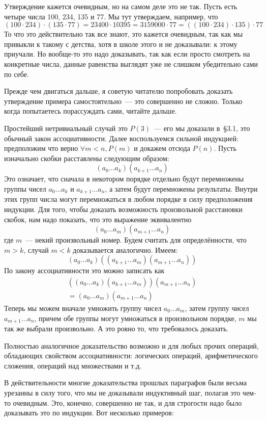 Утверждение кажется очевидным, но на самом деле это не так. Пусть есть четыре числа 100, 234, 135 и 77. Мы тут утверждаем, например, что
$$(100\cdot 234)\cdot (135 \cdot77) = 23400 \cdot 10395 = 3159000 \cdot 77 = ((100\cdot 234)\cdot 135) \cdot77$$
То что это действительно так все знают, это кажется очевидным, так как мы привыкли к такому с детства, хотя в школе этого и не доказывали: к этому приучали. Но вообще-то это надо доказывать, так как если просто смотреть на конкретные числа, данные равенства выглядят уже не слишком убедительно сами по себе.

Прежде чем двигаться дальше, я советую читателю попробовать доказать утверждение примера самостоятельно~--- это совершенно не сложно. Только когда попытаетесь порассуждать сами, читайте дальше.

Простейший нетривиальный случай это $P(3)$~--- его мы доказали в~\S3.1, это обычный закон ассоциативности. Далее воспользуемся сильной индукцией: предположим что верно $\forall m<n, P(m)$ и докажем отсюда $P(n)$. Пусть изначально скобки расставлены следующим образом:
$$(a_0\ldots a_k)(a_{k+1}\ldots a_n)$$
Это означает, что сначала в некотором порядке отдельно будут перемножены группы чисел $a_0\ldots a_k$ и $a_{k+1}\ldots a_n$, а затем будут перемножены результаты. Внутри этих групп числа могут перемножаться в любом порядке в силу предположения индукции. Для того, чтобы доказать возможность произвольной расстановки скобок, нам надо показать, что это выражение эквивалентно
$$(a_0\ldots a_m)(a_{m+1}\ldots a_n)$$
где $m$~--- некий произвольный номер. Будем считать для определённости, что $m>k$, случай $m<k$ доказывается аналогично. Имеем:
$$(a_0\ldots a_k)((a_{k+1}\ldots a_m)(a_{m+1}\ldots a_n))$$
По закону ассоциативности это можно записать как
\begin{align*}
((a_0\ldots a_k)(a_{k+1}\ldots a_m))(a_{m+1}\ldots a_n)\\
= (a_0\ldots  a_m)(a_{m+1}\ldots a_n)
\end{align*}
Теперь мы можем вначале умножить группу чисел $a_0\ldots a_m$, затем группу чисел $a_{m+1}\ldots a_n$, причем обе группы могут умножаться в произвольном порядке, $m$ мы так же выбрали произвольно. А это ровно то, что требовалось доказать.

Полностью аналогичное доказательство возможно и для любых прочих операций, обладающих свойством ассоциативности: логических операций, арифметического сложения, операций над множествами и т.д.

В действительности многие доказательства прошлых параграфов были весьма урезанны в силу того, что мы не доказывали индуктивный шаг, полагая это чем-то очевидным. Это, конечно, совершенно не так, и для строгости надо было доказывать это по индукции. Вот несколько примеров:

